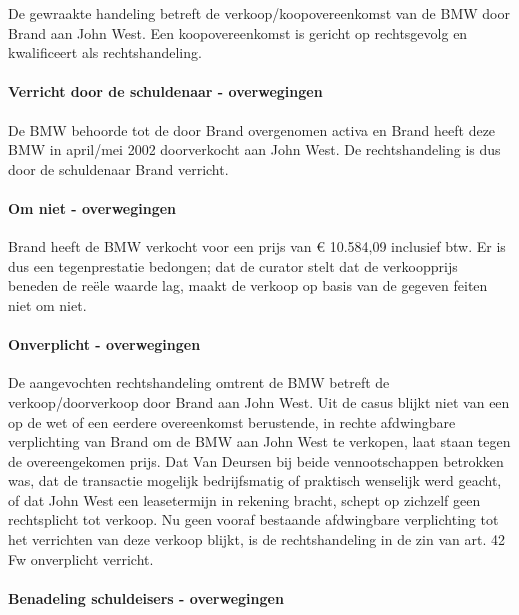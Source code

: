 \documentclass[
  dutch,
  a4paper,
]{article}
\begin{document}
De gewraakte handeling betreft de verkoop/koopovereenkomst van de BMW door Brand aan John West. Een koopovereenkomst is gericht op rechtsgevolg en kwalificeert als rechtshandeling.

\paragraph{Verricht door de schuldenaar - overwegingen}\label{verricht-door-de-schuldenaar---overwegingen-55}

De BMW behoorde tot de door Brand overgenomen activa en Brand heeft deze BMW in april/mei 2002 doorverkocht aan John West. De rechtshandeling is dus door de schuldenaar Brand verricht.

\paragraph{Om niet - overwegingen}\label{om-niet---overwegingen-55}

Brand heeft de BMW verkocht voor een prijs van € 10.584,09 inclusief btw. Er is dus een tegenprestatie bedongen; dat de curator stelt dat de verkoopprijs beneden de reële waarde lag, maakt de verkoop op basis van de gegeven feiten niet om niet.

\paragraph{Onverplicht - overwegingen}\label{onverplicht---overwegingen-55}

De aangevochten rechtshandeling omtrent de BMW betreft de verkoop/doorverkoop door Brand aan John West. Uit de casus blijkt niet van een op de wet of een eerdere overeenkomst berustende, in rechte afdwingbare verplichting van Brand om de BMW aan John West te verkopen, laat staan tegen de overeengekomen prijs. Dat Van Deursen bij beide vennootschappen betrokken was, dat de transactie mogelijk bedrijfsmatig of praktisch wenselijk werd geacht, of dat John West een leasetermijn in rekening bracht, schept op zichzelf geen rechtsplicht tot verkoop. Nu geen vooraf bestaande afdwingbare verplichting tot het verrichten van deze verkoop blijkt, is de rechtshandeling in de zin van art. 42 Fw onverplicht verricht.

\paragraph{Benadeling schuldeisers - overwegingen}\label{benadeling-schuldeisers---overwegingen-55}
\end{document}
